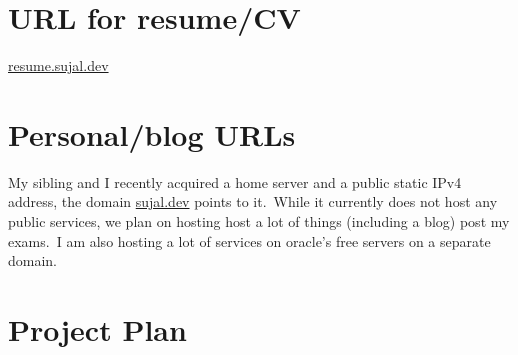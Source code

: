 \documentclass[11pt]{article}
\begin{document}
    \section{URL for resume/CV}
    \label{sec:resume}

    \href{https://resume.sujal.dev}{resume.sujal.dev}




    \section{Personal/blog URLs}
    \label{sec:personal-urls}

    My sibling and I recently acquired a home server and a public static IPv4 address, the domain
    \href{https://sujal.dev}{sujal.dev} points to it.\ While it currently does not host any public services, we plan
    on hosting host a lot of things (including a blog) post my exams.\ I am also hosting a lot of services on oracle's
    free servers on a separate domain.




    \section{Project Plan}
    \label{sec:project-plan}

    


\end{document}

